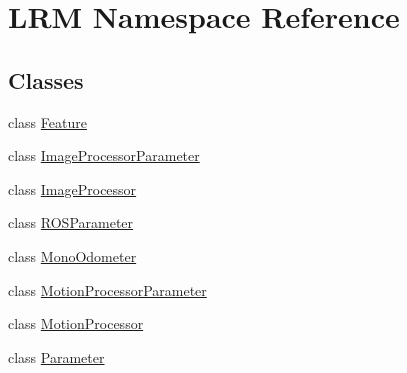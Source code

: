 \hypertarget{namespaceLRM}{\section{\-L\-R\-M \-Namespace \-Reference}
\label{namespaceLRM}
}
\subsection*{\-Classes}
\begin{DoxyCompactItemize}
\item 
class \hyperlink{classLRM_1_1Feature}{\-Feature}
\item 
class \hyperlink{classLRM_1_1ImageProcessorParameter}{\-Image\-Processor\-Parameter}
\item 
class \hyperlink{classLRM_1_1ImageProcessor}{\-Image\-Processor}
\item 
class \hyperlink{classLRM_1_1ROSParameter}{\-R\-O\-S\-Parameter}
\item 
class \hyperlink{classLRM_1_1MonoOdometer}{\-Mono\-Odometer}
\item 
class \hyperlink{classLRM_1_1MotionProcessorParameter}{\-Motion\-Processor\-Parameter}
\item 
class \hyperlink{classLRM_1_1MotionProcessor}{\-Motion\-Processor}
\item 
class \hyperlink{classLRM_1_1Parameter}{\-Parameter}
\end{DoxyCompactItemize}
